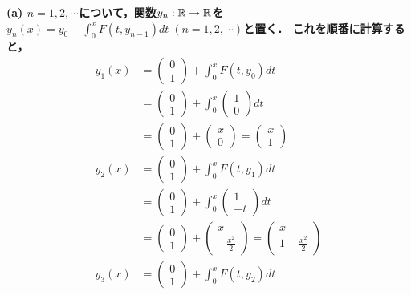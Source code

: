 \documentclass[uplatex,dvipdfmx]{jsarticle}
\begin{document}
\bf{(a)} $n=1,2,\cdots$について，関数$y_n:\mathbb{R}\to\mathbb{R}$を$y_n(x)=y_0+\int^x_0F(t,y_{n-1})dt\;(n=1,2,\cdots)$と置く．
これを順番に計算すると，
\begin{align*}
    y_1(x) &= \begin{pmatrix}0\\1\end{pmatrix} + \int^x_0F(t,y_0)dt\\
    &= \begin{pmatrix}0\\1\end{pmatrix} + \int^x_0\begin{pmatrix}1\\0\end{pmatrix}dt\\
    &= \begin{pmatrix}0\\1\end{pmatrix} + \begin{pmatrix}x\\0\end{pmatrix} = \begin{pmatrix}x\\1\end{pmatrix}\\
    y_2(x) &= \begin{pmatrix}0\\1\end{pmatrix} + \int^x_0F(t,y_1)dt\\
    &= \begin{pmatrix}0\\1\end{pmatrix} + \int^x_0\begin{pmatrix}1\\-t\end{pmatrix}dt\\
    &= \begin{pmatrix}0\\1\end{pmatrix} + \begin{pmatrix}x\\-\frac{x^2}{2}\end{pmatrix} = \begin{pmatrix}x\\1-\frac{x^2}{2}\end{pmatrix}\\
    y_3(x) &= \begin{pmatrix}0\\1\end{pmatrix} + \int^x_0F(t,y_2)dt\\

\end{align*}
\end{document}
